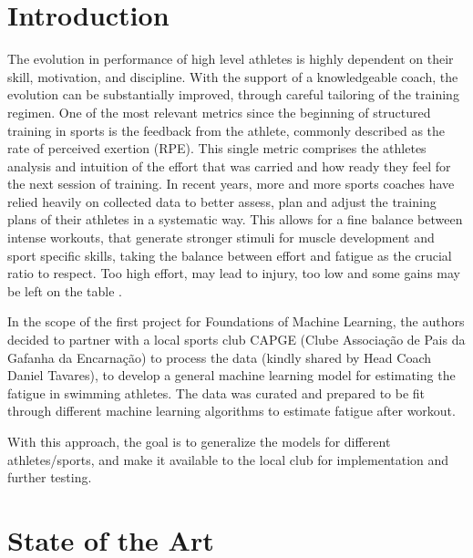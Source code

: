 \documentclass[conference]{IEEEtran}
\begin{document}
\IEEEpeerreviewmaketitle


\section{Introduction}
The evolution in performance of high level athletes is highly dependent on their skill, motivation, and discipline. With the support of a knowledgeable coach, the evolution can be substantially improved, through careful tailoring of the training regimen. One of the most relevant metrics since the beginning of structured training in sports is the feedback from the athlete, commonly described as the rate of perceived exertion (RPE). This single metric comprises the athletes analysis and intuition of the effort that was carried and how ready they feel for the next session of training. In recent years, more and more sports coaches have relied heavily on collected data to better assess, plan and adjust the training plans of their athletes in a systematic way. This allows for a fine balance between intense workouts, that generate stronger stimuli for muscle development and sport specific skills, taking the balance between effort and fatigue as the crucial ratio to respect. Too high effort, may lead to injury, too low and some gains may be left on the table \cite{Zatsiorsky2019}. 

In the scope of the first project for Foundations of Machine Learning, the authors decided to partner with a local sports club CAPGE (Clube Associação de Pais da Gafanha da Encarnação) to process the data (kindly shared by Head Coach Daniel Tavares), to develop a general machine learning model for estimating the fatigue in swimming athletes. The data was curated and prepared to be fit through different machine learning algorithms to estimate fatigue after workout.

With this approach, the goal is to generalize the models for different athletes/sports, and make it available to the local club for implementation and further testing. 



\section{State of the Art}
\end{document}
